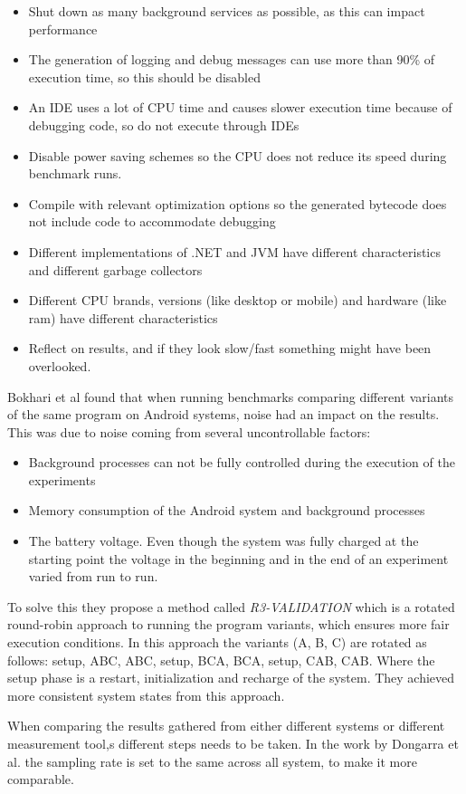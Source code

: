 \begin{itemize}
    \item Shut down as many background services as possible, as this can impact performance
    \item The generation of logging and debug messages can use more than 90\% of execution time, so this should be disabled
    \item An IDE uses a lot of CPU time and causes slower execution time because of debugging code, so do not execute through IDEs
    \item Disable power saving schemes so the CPU does not reduce its speed during benchmark runs.
    \item Compile with relevant optimization options so the generated bytecode does not include code to accommodate debugging
    \item Different implementations of .NET and JVM have different characteristics and different garbage collectors
    \item Different CPU brands, versions (like desktop or mobile) and hardware (like ram) have different characteristics
    \item Reflect on results, and if they look slow/fast something might have been overlooked.
\end{itemize}



Bokhari et al\cite{Bokhari2020r3} found that when running benchmarks comparing different variants of the same program on Android systems, noise had an impact on the results. This was due to noise coming from several uncontrollable factors:\cite*{Bokhari2020r3}
\begin{itemize}
    \item Background processes can not be fully controlled during the execution of the experiments
    \item Memory consumption of the Android system and background processes
    \item The battery voltage. Even though the system was fully charged at the starting point the voltage in the beginning and in the end of an experiment varied from run to run.
\end{itemize}
To solve this they propose a method called \textit{R3-VALIDATION} which is a rotated round-robin approach to running the program variants, which ensures more fair execution conditions. In this approach the variants (A, B, C) are rotated as follows: setup, ABC, ABC, setup, BCA, BCA, setup, CAB, CAB. Where the setup phase is a restart, initialization and recharge of the system. They achieved more consistent system states from this approach. \cite*{Bokhari2020r3}\nytafsnit

When comparing the results gathered from either different systems or different measurement tool,s different steps needs to be taken. In the work by Dongarra et al.\cite*[]{Dongarra2012} the sampling rate is set to the same across all system, to make it more comparable.